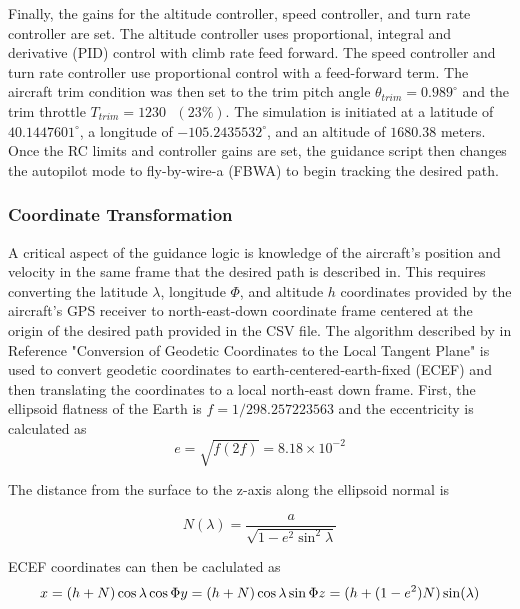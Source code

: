 \documentclass{aiaa}
\begin{document}
Finally, the gains for the altitude controller, speed controller, and turn rate controller are set. The altitude controller uses proportional, integral and derivative (PID) control with climb rate feed forward. The speed controller and turn rate controller use proportional control with a feed-forward term.
The aircraft trim condition was then set to the trim pitch angle $\theta_{trim} = 0.989^\circ$ and the trim throttle $T_{trim} = 1230\text{ } (23\%)$. The simulation is initiated at a latitude of $40.1447601^\circ$, a longitude of $-105.2435532^\circ$, and an altitude of $ 1680.38$ meters. Once the RC limits and controller gains are set, the guidance script then changes the autopilot mode to fly-by-wire-a (FBWA) to begin tracking the desired path.

\subsubsection{Coordinate Transformation}

A critical aspect of the guidance logic is knowledge of the aircraft's position and velocity in the same frame that the desired path is described in. This requires converting the latitude $\lambda$, longitude $\Phi$, and altitude $h$ coordinates provided by the aircraft's GPS receiver to north-east-down coordinate frame centered at the origin of the desired path provided in the CSV file. The algorithm described by in Reference "Conversion of Geodetic Coordinates to the Local Tangent Plane" is used to convert geodetic coordinates to earth-centered-earth-fixed (ECEF) and then translating the coordinates to a local north-east down frame. First, the ellipsoid flatness of the Earth is $f=1/298.257223563$ and the eccentricity is calculated as
\begin{equation}
e=\sqrt{f(2f)}=8.18\times10^{-2}
\end{equation}

The distance from the surface to the z-axis along the ellipsoid normal is

\begin{equation}
N(\lambda)=\frac{a}{\sqrt{1-e^2\sin^2{\lambda}}}
\end{equation}

ECEF coordinates can then be caclulated as
\begin{equation}
x=(h+N)\cos{\lambda}\cos{\Phi} \\
y=(h+N)\cos{\lambda}\sin{\Phi} \\
z=(h+(1-e^2)N)\sin(\lambda)
\end{equation}
\end{document}

